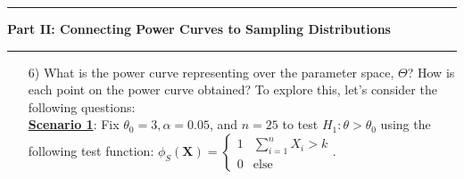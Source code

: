 \documentclass{TISE}
\begin{document}
\begin{center}
	\hrule
	\textbf{Part II: Connecting Power Curves to Sampling Distributions}	
	\hrule
\end{center}

\begin{enumerate}
	\item[6)] What is the power curve representing over the parameter space, $\Theta$? How is each point on the power curve obtained? To explore this, let's consider the following questions: \\
	
	\textbf{\underline{Scenario 1}}: Fix $\theta_0 = 3, \alpha = 0.05$, and $n = 25$ to test $H_1: \theta > \theta_0$ using the following test function: $\phi_S(\boldsymbol{X}) = \begin{cases}
	1 & \sum_{i=1}^n X_i > k \\ 0 & \text{else} \end{cases}$. 
	

\end{enumerate}
\end{document}
